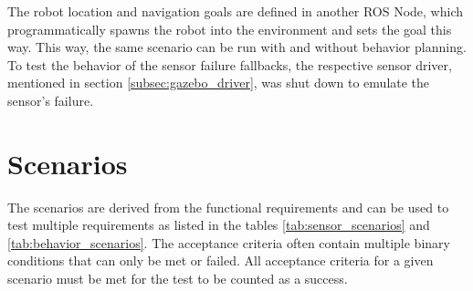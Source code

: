 The robot location and navigation goals are defined in another ROS Node, which programmatically spawns the robot into the environment and sets the goal this way. This way, the same scenario can be run with and without behavior planning. To test the behavior of the sensor failure fallbacks, the respective sensor driver, mentioned in section \ref{subsec:gazebo_driver}, was shut down to emulate the sensor's failure. 

\section{Scenarios}

The scenarios are derived from the functional requirements and can be used to test multiple requirements as listed in the tables \ref{tab:sensor_scenarios} and \ref{tab:behavior_scenarios}. The acceptance criteria often contain multiple binary conditions that can only be met or failed. All acceptance criteria for a given scenario must be met for the test to be counted as a success. 

